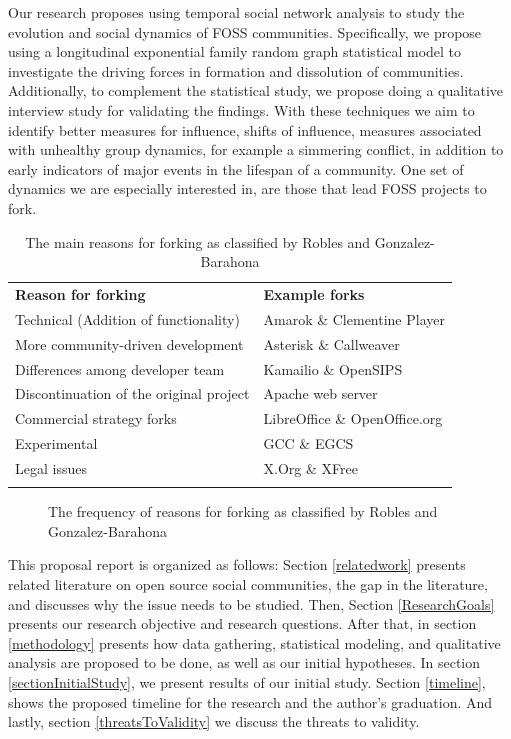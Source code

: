 \documentclass{acm_proc_article-sp}
\begin{document}
Our research proposes using temporal social network analysis to study the evolution and social dynamics of FOSS communities. Specifically, we propose using a longitudinal exponential family random graph statistical model to investigate the driving forces in formation and dissolution of communities. Additionally,  to complement the statistical study, we propose doing a qualitative interview study for validating the findings. With these techniques we aim to identify better measures for influence, shifts of influence, measures associated with unhealthy group dynamics, for example a simmering conflict, in addition to early indicators of major events in the lifespan of a community. One set of dynamics we are especially interested in, are those that lead FOSS projects to fork.\\

\begin{table}[!ht]
\centering
\caption{The main reasons for forking as classified by Robles and Gonzalez-Barahona \cite{Robles}}
\label{tableReasonsForForking}
\begin{tabular}{p{} p{}}
\hline\noalign{\smallskip}
\textbf{Reason for forking} & \textbf{Example forks} \\
\noalign{\smallskip}\hline\noalign{\smallskip}
Technical (Addition of functionality) & Amarok \& Clementine Player \\ \hline
More community-driven development & Asterisk \& Callweaver \\ \hline
Differences among developer team & Kamailio \& OpenSIPS \\ \hline
Discontinuation of the original project & Apache web server \\ \hline
Commercial strategy forks & LibreOffice \& OpenOffice.org \\ \hline
Experimental & GCC \& EGCS \\ \hline
Legal issues & X.Org \& XFree\\
\noalign{\smallskip}\hline
\end{tabular}
\end{table}

\begin{figure} [!ht]
\centering
\caption{The frequency of reasons for forking as classified by Robles and Gonzalez-Barahona \cite{Robles}}
\label{figureReasonsForForkingPieChart}
\end{figure}

This proposal report is organized as follows: Section \ref{relatedwork} presents related literature on open source social communities, the gap in the literature, and discusses why the issue needs to be studied. 
Then, Section \ref{ResearchGoals} presents our research objective and research questions. After that, in section \ref{methodology} presents how data gathering, statistical modeling, and qualitative analysis are proposed to be done, as well as our initial hypotheses. In section \ref{sectionInitialStudy}, we present results of our initial study. Section \ref{timeline}, shows the proposed timeline for the research and the author's graduation. And lastly, section \ref{threatsToValidity} we discuss the threats to validity.\\
\end{document}
